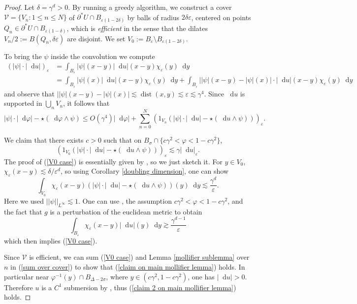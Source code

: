 \documentclass[reqno,10pt]{amsart}
\newcommand*\dif{\mathop{}\!\mathrm{d}}
\DeclareMathOperator{\dist}{dist}
\newcommand{\dfn}[1]{\emph{#1}\index{#1}}
\theoremstyle{definition}
\numberwithin{equation}{section}
\begin{document}
\begin{proof}
Let $\delta = \gamma^d > 0$.
By running a greedy algorithm, we construct a cover $\mathcal V = \{V_n: 1 \leq n \leq N\}$ of $\partial^* U \cap B_{\varepsilon(1 - 2\delta)}$ by balls of radius $2\delta\varepsilon$, centered on points $Q_n \in \partial^* U \cap B_{\varepsilon(1 - \delta)}$, which is \dfn{efficient} in the sense that the dilates $V_n/2 := B(Q_n, \delta\varepsilon)$ are disjoint.
We set $V_0 := B_\varepsilon \setminus B_{\varepsilon(1 - 2\delta)}$.

To bring the $\psi$ inside the convolution we compute
\begin{align*}
(|\psi| \cdot |\dif u|)_\varepsilon
&= \int_{B_\varepsilon} |\psi|(x - y) |\dif u|(x - y) \chi_\varepsilon(y) \dif y \\
&= \int_{B_\varepsilon} |\psi|(x) |\dif u|(x - y) \chi_\varepsilon(y) \dif y + \int_{B_\varepsilon} ||\psi|(x - y) - |\psi|(x)| \cdot |\dif u|(x - y) \chi_\varepsilon(y) \dif y
\end{align*}
and observe that $||\psi|(x - y) - |\psi|(x)| \lesssim \dist(x, y) \lesssim \varepsilon \lesssim \gamma^4$.
Since $\dif u$ is supported in $\bigcup_n V_n$, it follows that
\begin{equation}\label{sum over cover}
|\psi| \cdot |\dif \varphi| - \star(\dif \varphi \wedge \psi)
\leq O(\gamma^4) |\dif \varphi| + \sum_{n=0}^N (1_{V_n}(|\psi| \cdot |\dif u| - \star(\dif u \wedge \psi)))_\varepsilon.
\end{equation}

We claim that there exists $c > 0$ such that on $B_\sigma \cap \{c\gamma^2 < \varphi < 1 - c\gamma^2\}$,
\begin{equation}\label{V0 case}
(1_{V_0}(|\psi| \cdot |\dif u| - \star(\dif u \wedge \psi)))_\varepsilon \lesssim \gamma |\dif u|_\varepsilon.
\end{equation}
The proof of (\ref{V0 case}) is essentially given by \cite[pg92]{Giusti77}, so we just sketch it.
For $y \in V_0$, $\chi_\varepsilon(x - y) \lesssim \delta/\varepsilon^d$, so using Corollary \ref{doubling dimension}, one can show
$$\int_{V_0} \chi_\varepsilon(x - y)(|\psi| \cdot |\dif u| - \star(\dif u \wedge \psi))(y) \dif y \lesssim \frac{\gamma^d}{\varepsilon}.$$
Here we used $||\psi||_{L^\infty} \lesssim 1$.
One can use \cite[Lemma 7.1]{Giusti77}, the assumption $c\gamma^2 < \varphi < 1 - c\gamma^2$, and the fact that $g$ is a perturbation of the euclidean metric to obtain
$$\int_{B_\varepsilon} \chi_\varepsilon(x - y) |\dif u|(y) \dif y \gtrsim \frac{\gamma^{d - 1}}{\varepsilon}$$
which then implies (\ref{V0 case}).

Since $\mathcal V$ is efficient, we can sum (\ref{V0 case}) and Lemma \ref{mollifier sublemma} over $n$ in (\ref{sum over cover}) to show that (\ref{claim on main mollifier lemma}) holds.
In particular near $\varphi^{-1}(y) \cap B_{\Delta - 2\sigma}$, where $y \in (c\gamma^2, 1 - c\gamma^2)$, one has $|\dif u| > 0$.
Therefore $u$ is a $C^1$ submersion by \cite[Lemma 7.1]{Giusti77}, thus (\ref{claim 2 on main mollifier lemma}) holds.
\end{proof}
\end{document}
